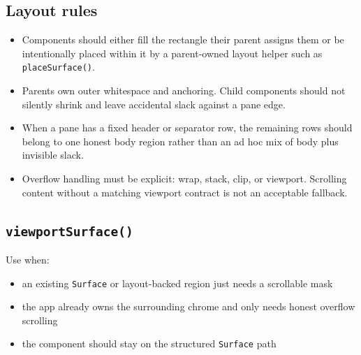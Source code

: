 \subsection{Layout rules}\label{record-023-layout-rules}

\begin{itemize}
\tightlist
\item
  Components should either fill the rectangle their parent assigns them or be intentionally placed within it by a parent-owned layout helper such as \texttt{p\allowbreak{}l\allowbreak{}a\allowbreak{}c\allowbreak{}e\allowbreak{}S\allowbreak{}u\allowbreak{}r\allowbreak{}f\allowbreak{}a\allowbreak{}c\allowbreak{}e\allowbreak{}(\allowbreak{})}.
\item
  Parents own outer whitespace and anchoring. Child components should not silently shrink and leave accidental slack against a pane edge.
\item
  When a pane has a fixed header or separator row, the remaining rows should belong to one honest body region rather than an ad hoc mix of body plus invisible slack.
\item
  Overflow handling must be explicit: wrap, stack, clip, or viewport. Scrolling content without a matching viewport contract is not an acceptable fallback.
\end{itemize}

\subsection{\texorpdfstring{\texttt{v\allowbreak{}i\allowbreak{}e\allowbreak{}w\allowbreak{}p\allowbreak{}o\allowbreak{}r\allowbreak{}t\allowbreak{}S\allowbreak{}u\allowbreak{}r\allowbreak{}f\allowbreak{}a\allowbreak{}c\allowbreak{}e\allowbreak{}(\allowbreak{})}}{}}\label{record-023-viewportsurface}

Use when:

\begin{itemize}
\tightlist
\item
  an existing \texttt{S\allowbreak{}u\allowbreak{}r\allowbreak{}f\allowbreak{}a\allowbreak{}c\allowbreak{}e} or layout-backed region just needs a scrollable mask
\item
  the app already owns the surrounding chrome and only needs honest overflow scrolling
\item
  the component should stay on the structured \texttt{S\allowbreak{}u\allowbreak{}r\allowbreak{}f\allowbreak{}a\allowbreak{}c\allowbreak{}e} path
\end{itemize}

